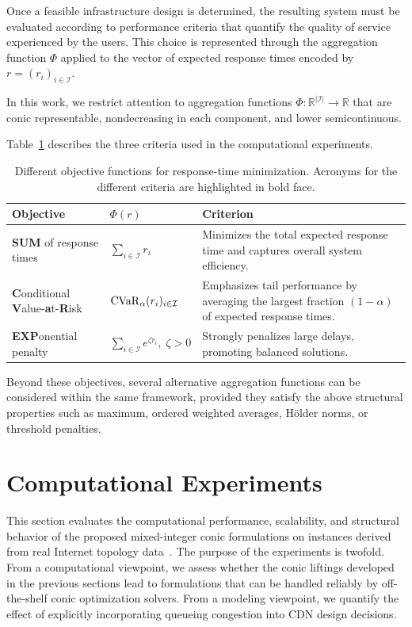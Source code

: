 \documentclass[a4paper,11pt,reqno]{amsart}
\newcommand{\dsum}{\displaystyle\sum}
\newcommand{\I}{\mathcal{I}}
\begin{document}
Once a feasible infrastructure design is determined, the resulting system must be evaluated according to performance criteria that quantify the quality of service experienced by the users. This choice is represented through the aggregation function $\Phi$ applied to the vector of expected response times encoded by $r=(r_i)_{i\in\I}$.

In this work, we restrict attention to aggregation functions $\Phi:\mathbb{R}^{|\I|}\to\mathbb{R}$ that are conic representable, nondecreasing in each component, and lower semicontinuous.

Table~\ref{tab:objectives} describes the three criteria used in the computational experiments.
\renewcommand{\arraystretch}{1.2}
\begin{table}[htbp]
\centering
\begin{tabular}{m{3.6cm} >{\centering\arraybackslash}m{2.2cm} m{5.6cm}}
\toprule
\textbf{Objective} & $\Phi(r)$ & \textbf{Criterion} \\
\midrule
{\bf SUM} of response times&
$\dsum_{i\in\I} r_i$
&
Minimizes the total expected response time and captures overall system efficiency.\\
{\bf C}onditional {\bf V}alue-{\bf a}t-{\bf R}isk &
${\rm CVaR}_\alpha(r_i)_{i\in\I}$
&
Emphasizes tail performance by averaging the largest fraction
$(1-\alpha)$ of expected response times.\\
{\bf EXP}onential penalty &
$\dsum_{i\in\I} e^{\zeta r_i},
\; \zeta>0$
&
Strongly penalizes large delays, promoting balanced solutions.\\
\bottomrule
\end{tabular}
\caption{Different objective functions for response-time minimization. Acronyms for the different criteria are highlighted in bold face.}
\label{tab:objectives}
\end{table}

Beyond these objectives, several alternative aggregation functions can be considered within the same framework, provided they satisfy the above structural properties such as maximum, ordered weighted averages, H\"older norms, or threshold penalties.


\section{Computational Experiments}
\label{sec:computational}

This section evaluates the computational performance, scalability, and structural behavior of the proposed mixed-integer conic formulations on instances derived from real Internet topology data~\citep{ITDK}. The purpose of the experiments is twofold. From a computational viewpoint, we assess whether the conic liftings developed in the previous sections lead to formulations that can be handled reliably by off-the-shelf conic optimization solvers. From a modeling viewpoint, we quantify the effect of explicitly incorporating queueing congestion into CDN design decisions.
\end{document}
